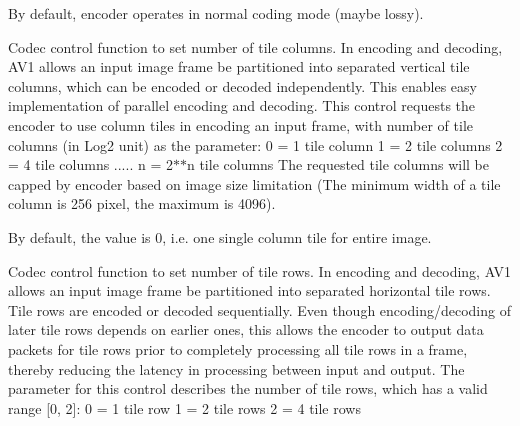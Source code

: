 \begin{Desc}
\begin{description}
By default, encoder operates in normal coding mode (maybe lossy). \item[{\em 
A\+V1\+E\+\_\+\+S\+E\+T\+\_\+\+T\+I\+L\+E\+\_\+\+C\+O\+L\+U\+M\+NS\hypertarget{group__aom__encoder_ggae78dde67a6d78f332e9bdba0dde42db5acf4ab1ff2fa8d76a78881ad7f1a1294d}{}\label{group__aom__encoder_ggae78dde67a6d78f332e9bdba0dde42db5acf4ab1ff2fa8d76a78881ad7f1a1294d}
}]Codec control function to set number of tile columns. In encoding and decoding, A\+V1 allows an input image frame be partitioned into separated vertical tile columns, which can be encoded or decoded independently. This enables easy implementation of parallel encoding and decoding. This control requests the encoder to use column tiles in encoding an input frame, with number of tile columns (in Log2 unit) as the parameter\+: 0 = 1 tile column 1 = 2 tile columns 2 = 4 tile columns ..... n = 2$\ast$$\ast$n tile columns The requested tile columns will be capped by encoder based on image size limitation (The minimum width of a tile column is 256 pixel, the maximum is 4096).

By default, the value is 0, i.\+e. one single column tile for entire image. \item[{\em 
A\+V1\+E\+\_\+\+S\+E\+T\+\_\+\+T\+I\+L\+E\+\_\+\+R\+O\+WS\hypertarget{group__aom__encoder_ggae78dde67a6d78f332e9bdba0dde42db5a57f2f2a54f593b398a5e97db7982f817}{}\label{group__aom__encoder_ggae78dde67a6d78f332e9bdba0dde42db5a57f2f2a54f593b398a5e97db7982f817}
}]Codec control function to set number of tile rows. In encoding and decoding, A\+V1 allows an input image frame be partitioned into separated horizontal tile rows. Tile rows are encoded or decoded sequentially. Even though encoding/decoding of later tile rows depends on earlier ones, this allows the encoder to output data packets for tile rows prior to completely processing all tile rows in a frame, thereby reducing the latency in processing between input and output. The parameter for this control describes the number of tile rows, which has a valid range \mbox{[}0, 2\mbox{]}\+: 0 = 1 tile row 1 = 2 tile rows 2 = 4 tile rows


\end{description}
\end{Desc}
